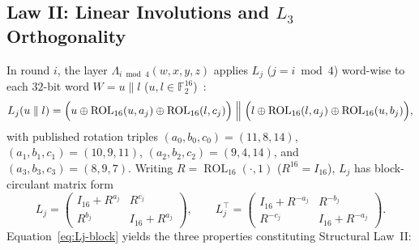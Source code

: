 \documentclass[11pt,a4paper]{article}
\theoremstyle{definition}
\theoremstyle{remark}
\newcommand{\Ftwo}{\mathbb{F}_2}
\newcommand{\ROL}{\operatorname{ROL}}
\begin{document}
\subsection{Law II: Linear Involutions and \texorpdfstring{$L_3$}{L\_3} Orthogonality}
In round $i$, the layer $\Lambda_{i \bmod 4}(w,x,y,z)$ applies $L_j$ ($j = i \bmod 4$) word-wise to each $32$-bit word $W = u \parallel l$ ($u, l \in \Ftwo^{16}$)~\cite[Figure~3.2, p.~5]{GMW24}:
\begin{equation}
\label{eq:Lj}
L_j(u \parallel l) = \Bigl(u \oplus \ROL_{16}(u, a_j) \oplus \ROL_{16}(l, c_j)\Bigr) \;\Big\|\; \Bigl(l \oplus \ROL_{16}(l, a_j) \oplus \ROL_{16}(u, b_j)\Bigr),
\end{equation}
with published rotation triples $(a_0,b_0,c_0) = (11,8,14)$, $(a_1,b_1,c_1) = (10,9,11)$, $(a_2,b_2,c_2) = (9,4,14)$, and $(a_3,b_3,c_3) = (8,9,7)$. Writing $R = \ROL_{16}(\cdot, 1)$ ($R^{16} = I_{16}$), $L_j$ has block-circulant matrix form
\begin{equation}
\label{eq:Lj-block}
L_j = \begin{pmatrix} I_{16} + R^{a_j} & R^{c_j} \\ R^{b_j} & I_{16} + R^{a_j} \end{pmatrix}, \qquad
L_j^\top = \begin{pmatrix} I_{16} + R^{-a_j} & R^{-b_j} \\ R^{-c_j} & I_{16} + R^{-a_j} \end{pmatrix}.
\end{equation}
Equation~\eqref{eq:Lj-block} yields the three properties constituting Structural Law~II:
\end{document}

